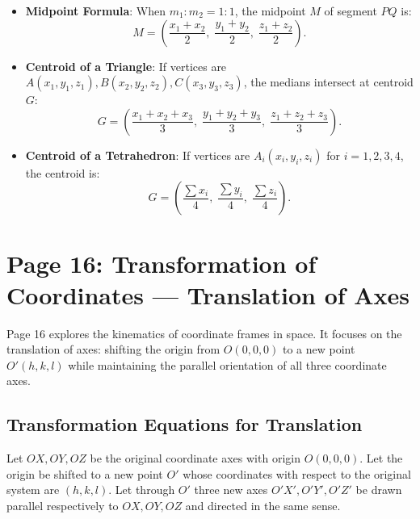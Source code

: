 \begin{notebox}
\begin{itemize}[noitemsep]
    \item \textbf{Midpoint Formula}: When $m_1 : m_2 = 1 : 1$, the midpoint $M$ of segment $PQ$ is:
    \begin{equation}
        M = \left(\frac{x_1 + x_2}{2}, \; \frac{y_1 + y_2}{2}, \; \frac{z_1 + z_2}{2}\right).
    \end{equation}
    \item \textbf{Centroid of a Triangle}: If vertices are $A(x_1, y_1, z_1), B(x_2, y_2, z_2), C(x_3, y_3, z_3)$, the medians intersect at centroid $G$:
    \begin{equation}
        G = \left(\frac{x_1+x_2+x_3}{3}, \; \frac{y_1+y_2+y_3}{3}, \; \frac{z_1+z_2+z_3}{3}\right).
    \end{equation}
    \item \textbf{Centroid of a Tetrahedron}: If vertices are $A_i(x_i, y_i, z_i)$ for $i=1,2,3,4$, the centroid is:
    \begin{equation}
        G = \left(\frac{\sum x_i}{4}, \; \frac{\sum y_i}{4}, \; \frac{\sum z_i}{4}\right).
    \end{equation}
\end{itemize}
\end{notebox}

\section{Page 16: Transformation of Coordinates --- Translation of Axes}
\label{sec:page16}

\begin{conceptbox}
Page 16 explores the kinematics of coordinate frames in space. It focuses on the translation of axes: shifting the origin from $O(0,0,0)$ to a new point $O'(h, k, l)$ while maintaining the parallel orientation of all three coordinate axes.
\end{conceptbox}

\subsection{Transformation Equations for Translation}
Let $OX, OY, OZ$ be the original coordinate axes with origin $O(0,0,0)$.
Let the origin be shifted to a new point $O'$ whose coordinates with respect to the original system are $(h, k, l)$.
Let through $O'$ three new axes $O'X', O'Y', O'Z'$ be drawn parallel respectively to $OX, OY, OZ$ and directed in the same sense.

